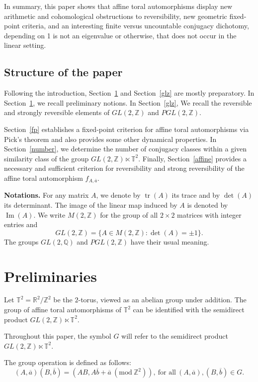 \documentclass[12pt]{amsart}
\theoremstyle{plain}
\theoremstyle{definition}
\theoremstyle{remark}
\begin{document}
In summary, this paper shows that affine toral automorphisms display new arithmetic and cohomological obstructions to reversibility, new geometric fixed-point criteria, and an interesting finite versus uncountable conjugacy dichotomy, depending on 1 is not an eigenvalue or otherwise,  that does not occur in the linear setting.

\subsection*{Structure of the paper}

Following the introduction, Section~\ref{prel} and Section~\ref{glz} are mostly preparatory. In Section~\ref{prel}, we recall preliminary notions. In Section~\ref{glz}, We recall the reversible and strongly reversible elements of $GL(2,\mathbb{Z})$ and $PGL(2,\mathbb{Z})$. 

Section~\ref{fp} establishes a fixed-point criterion for affine toral automorphisms via Pick’s theorem and also provides some other dynamical properties. In Section~\ref{number}, we determine the number of conjugacy classes within a given similarity class of the group $GL(2,\mathbb{Z})\ltimes\mathbb{T}^2.$ Finally, Section~\ref{affine}  provides a necessary and sufficient criterion for reversibility and strong reversibility of the affine toral automorphism $f_{A,\overline{a}}$.

\textbf{Notations.} For any matrix \(A\), we denote by \(\operatorname{tr}(A)\) its trace and by \(\det(A)\) its determinant. The image of the linear map induced by \(A\) is denoted by \(\operatorname{Im}(A)\). We write \(M(2,\mathbb{Z})\) for the group of all \(2\times 2\) matrices with integer entries and
\[
GL(2,\mathbb{Z})=\{A\in M(2,\mathbb{Z}) : \det(A)=\pm 1\}.
\]
The groups \(GL(2,\mathbb{Q})\) and \(PGL(2,\mathbb{Z})\) have their usual meaning.


\section{Preliminaries}\label{prel}
Let $\mathbb{T}^2=\mathbb{R}^2/\mathbb{Z}^2$ be the $2$-torus, viewed as an abelian group under addition. The group of affine toral automorphisms of $\mathbb{T}^2$ can be identified with the semidirect product $GL(2,\mathbb Z)\ltimes\mathbb T^{2}$. 

Throughout this paper, the symbol $G$ will refer to the semidirect product $GL(2,\mathbb{Z})\ltimes\mathbb{T}^2.$

The group operation is defined as follows:
\[(A,\overline{a})(B,\overline{b})=(AB,A\overline{b}+\overline{a}~(\text{mod}~\mathbb{Z}^2)), ~\text{for all}~(A,\overline{a}),(B,\overline{b})\in G.\]
\end{document}
